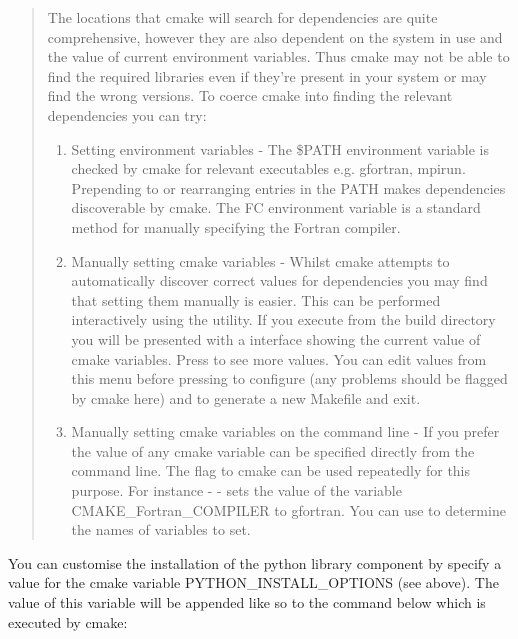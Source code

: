 \documentclass[letterpaper,10pt,english]{sphinxmanual}
\begin{document}
\begin{quote}

The locations that cmake will search for dependencies are quite comprehensive, however they are also dependent on the system in use and the value of current environment variables. Thus cmake may not be able to find the required libraries even if they’re present in your system or may find the wrong versions. To coerce cmake into finding the relevant dependencies you can try:
\begin{enumerate}
\item {} 
Setting environment variables - The \$PATH environment variable is checked by cmake for relevant executables e.g. gfortran, mpirun. Prepending to or rearranging entries in the PATH makes dependencies discoverable by cmake. The FC environment variable is a standard method for manually specifying the Fortran compiler.

\item {} 
Manually setting cmake variables - Whilst cmake attempts to automatically discover correct values for dependencies you may find that setting them manually is easier. This can be performed interactively using the  utility. If you execute  from the build directory you will be presented with a interface showing the current value of cmake variables. Press  to see more values. You can edit values from this menu before pressing  to configure (any problems should be flagged by cmake here) and  to generate a new Makefile and exit.

\item {} 
Manually setting cmake variables on the command line - If you prefer the value of any cmake variable can be specified directly from the command line. The  flag to cmake can be used repeatedly for this purpose. For instance -  - sets the value of the  variable CMAKE\_Fortran\_COMPILER to gfortran. You can use  to determine the names of variables to set.

\end{enumerate}
\end{quote}


You can customise the installation of the python library component by specify a value for the cmake variable PYTHON\_INSTALL\_OPTIONS (see above). The value of this variable will be appended like so to the command below which is executed by cmake:
\end{document}
